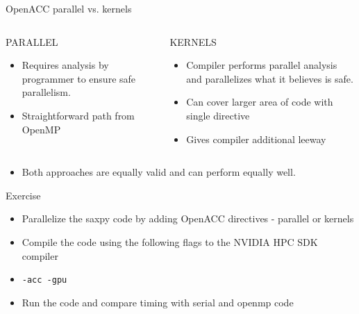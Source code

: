 \documentclass[10pt,t]{beamer}
\begin{document}
\begin{frame}{ OpenACC parallel vs. kernels}
  \begin{columns}
    \begin{block}{PARALLEL}
      \begin{itemize}
        \item Requires analysis by programmer to ensure safe parallelism.
        \item Straightforward path from OpenMP
      \end{itemize}
    \end{block}
    \begin{block}{KERNELS}
      \begin{itemize}
        \item Compiler performs parallel analysis and parallelizes what it believes is safe.
        \item Can cover larger area of code with single directive
        \item Gives compiler additional leeway
      \end{itemize}
    \end{block}
  \end{columns}
  \begin{itemize}
    \item[] Both approaches are equally valid and can perform equally well.
  \end{itemize}
\end{frame}

\begin{frame}[fragile]{Exercise}
  \begin{itemize}
    \item Parallelize the saxpy code by adding OpenACC directives - parallel or kernels
    \item Compile the code using the following flags to the NVIDIA HPC SDK compiler
    \item[] \lstinline[basicstyle=\normalsize\ttfamily]|-acc -gpu|
    \item Run the code and compare timing with serial and openmp code
  \end{itemize}
\end{frame}
\end{document}
